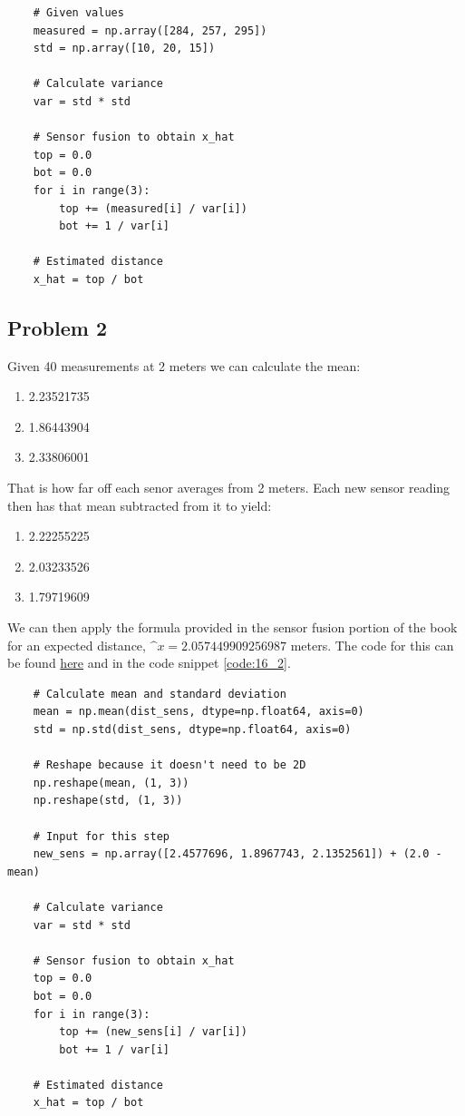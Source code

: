 \documentclass{article}
\begin{document}
\begin{code}
\label{code:16_1}
\begin{verbatim}
    # Given values
    measured = np.array([284, 257, 295])
    std = np.array([10, 20, 15])

    # Calculate variance
    var = std * std

    # Sensor fusion to obtain x_hat
    top = 0.0
    bot = 0.0
    for i in range(3):
        top += (measured[i] / var[i])
        bot += 1 / var[i]

    # Estimated distance
    x_hat = top / bot
\end{verbatim}
\end{code}


\subsection{Problem 2}{\label{problem:16.2}}
Given 40 measurements at 2 meters we can calculate the mean:

\begin{enumerate}[label=\Alph*]
    \item 2.23521735
    \item 1.86443904
    \item 2.33806001
\end{enumerate}

That is how far off each senor averages from 2 meters. Each new sensor reading 
then has that mean subtracted from it to yield:

\begin{enumerate}[label=\Alph*]
    \item 2.22255225
    \item 2.03233526
    \item 1.79719609
\end{enumerate}

We can then apply the formula provided in the sensor fusion portion of the book 
for an expected distance, $\^{x} = 2.057449909256987$ meters. The code for 
this can be found 
\href{https://github.com/macattackftw/RoboticsHW/blob/master/HW5/problem16_2.py}{here} 
and in the code snippet \ref{code:16_2}.

\begin{code}
\label{code:16_2}
\begin{verbatim}
    # Calculate mean and standard deviation
    mean = np.mean(dist_sens, dtype=np.float64, axis=0)
    std = np.std(dist_sens, dtype=np.float64, axis=0)

    # Reshape because it doesn't need to be 2D
    np.reshape(mean, (1, 3))
    np.reshape(std, (1, 3))

    # Input for this step
    new_sens = np.array([2.4577696, 1.8967743, 2.1352561]) + (2.0 - mean)

    # Calculate variance
    var = std * std

    # Sensor fusion to obtain x_hat
    top = 0.0
    bot = 0.0
    for i in range(3):
        top += (new_sens[i] / var[i])
        bot += 1 / var[i]

    # Estimated distance
    x_hat = top / bot
\end{verbatim}
\end{code}
\end{document}
